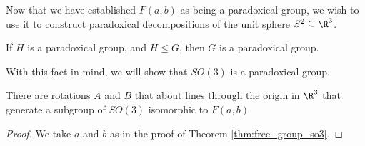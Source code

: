 Now that we have established $F(a,b)$ as being a paradoxical group, we wish to use it to construct paradoxical decompositions of the unit sphere $S^2 \subseteq \R^3$.
\begin{fact}
  If $H$ is a paradoxical group, and $H\leq G$, then $G$ is a paradoxical group.
\end{fact}
With this fact in mind, we will show that $SO(3)$ is a paradoxical group.
\begin{theorem}
  There are rotations $A$ and $B$ that about lines through the origin in $\R^3$ that generate a subgroup of $SO(3)$ isomorphic to $F(a,b)$
\end{theorem}
\begin{proof}
  We take $a$ and $b$ as in the proof of Theorem \ref{thm:free_group_so3}.
%
%

\end{proof}
